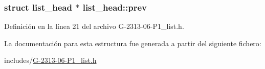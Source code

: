 \subsubsection[{\texorpdfstring{prev}{prev}}]{\setlength{\rightskip}{0pt plus 5cm}struct {\bf list\+\_\+head} $\ast$ list\+\_\+head\+::prev}\hypertarget{structlist__head_aaa0eabda8877e1d6de73a33f223ad004}{}\label{structlist__head_aaa0eabda8877e1d6de73a33f223ad004}


Definición en la línea 21 del archivo G-\/2313-\/06-\/\+P1\+\_\+list.\+h.



La documentación para esta estructura fue generada a partir del siguiente fichero\+:\begin{DoxyCompactItemize}
\item 
includes/\hyperlink{G-2313-06-P1__list_8h}{G-\/2313-\/06-\/\+P1\+\_\+list.\+h}\end{DoxyCompactItemize}
